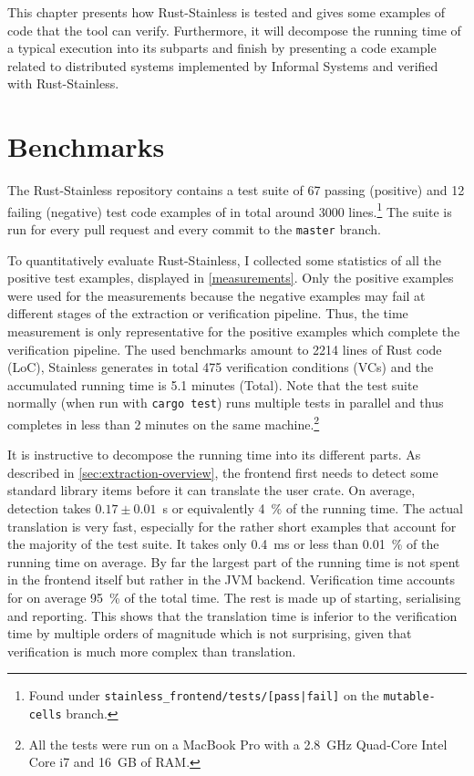 This chapter presents how Rust-Stainless is tested and gives some examples of
code that the tool can verify. Furthermore, it will decompose the running time
of a typical execution into its subparts and finish by presenting a code example
related to distributed systems implemented by Informal Systems and verified with
Rust-Stainless.

\section{Benchmarks}

The Rust-Stainless repository contains a test suite of 67 passing (positive) and
12 failing (negative) test code examples of in total around 3000
lines.\footnote{Found under \texttt{stainless\_frontend/tests/[pass|fail]} on
the \texttt{mutable-cells} branch.} The suite is run for every pull request and
every commit to the \texttt{master} branch.

To quantitatively evaluate Rust-Stainless, I collected some statistics of all
the positive test examples, displayed in \autoref{measurements}. Only the
positive examples were used for the measurements because the negative examples
may fail at different stages of the extraction or verification pipeline. Thus,
the time measurement is only representative for the positive examples which
complete the verification pipeline. The used benchmarks amount to 2214 lines of
Rust code (LoC), Stainless generates in total 475 verification conditions (VCs)
and the accumulated running time is 5.1 minutes (Total). Note that the test
suite normally (when run with \texttt{cargo test}) runs multiple tests in
parallel and thus completes in less than 2 minutes on the same
machine.\footnote{All the tests were run on a MacBook Pro with a 2.8~GHz
Quad-Core Intel Core i7 and 16~GB of RAM.}

It is instructive to decompose the running time into its different parts. As
described in \autoref{sec:extraction-overview}, the frontend first needs to
detect some standard library items before it can translate the user crate. On
average, detection takes $0.17 \pm 0.01$~s or equivalently 4~\% of the running
time. The actual translation is very fast, especially for the rather short
examples that account for the majority of the test suite. It takes only 0.4~ms
or less than 0.01~\% of the running time on average. By far the largest part of
the running time is not spent in the frontend itself but rather in the JVM
backend. Verification time accounts for on average 95~\% of the total time. The
rest is made up of starting, serialising and reporting. This shows that the
translation time is inferior to the verification time by multiple orders of
magnitude which is not surprising, given that verification is much more complex
than translation.

